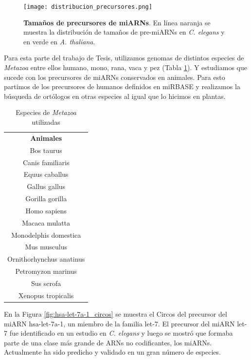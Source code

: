 \begin{figure}[htbp!] 
	\centering    
	\texttt{[image: distribucion\_precursores.png]}
	\caption[Tamaños de precursores de miARNs]{
		\textbf{Tamaños de precursores de miARNs}.
		En línea naranja se muestra la distribución de tamaños de pre-miARNs en \textit{C. elegans} y en verde en \textit{A. thaliana}.
	}
	\label{fig:distribucion_precursores}
\end{figure}


Para esta parte del trabajo de Tesis, utilizamos genomas de distintos especies de \textit{Metazoa} entre ellos humano, mono, rana, vaca y pez (Tabla \ref{table:db_metazoa}).
Y estudiamos que sucede con los precursores de miARNs conservados en animales.
Para esto partimos de los precursores de humanos definidos en miRBASE y realizamos la búsqueda de ortólogos en otras especies al igual que lo hicimos en plantas.

\begin{table}[!htbp]
\centering
\small
\caption{Especies de \textit{Metazoa} utilizadas}
\label{table:db_metazoa}
\begin{tabular}{c}
\rowcolor[HTML]{ECF4FF} 
\textbf{Animales}        \\
	Bos taurus               \\
	Canis familiaris         \\
	Equus caballus           \\
	Gallus gallus            \\
	Gorilla gorilla          \\
	Homo sapiens             \\
	Macaca mulatta           \\
	Monodelphis domestica    \\
	Mus musculus             \\
	Ornithorhynchus anatinus \\
	Petromyzon marinus       \\
	Sus scrofa               \\
	Xenopus tropicalis      
\end{tabular}
\end{table}

En la Figura \ref{fig:hsa-let-7a-1_circos} se muestra el Circos del precursor del miARN hsa-let-7a-1, un miembro de la familia let-7.
El precursor del miARN let-7 fue identificado en un estudio en \textit{C. elegans} y luego se mostró que formaba parte de una clase más grande de ARNs no codificantes, los miARNs.
Actualmente ha sido predicho y validado en un gran número de especies.

